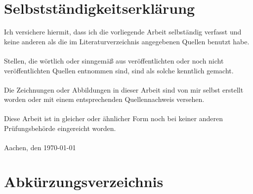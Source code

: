 \documentclass[a4paper,12pt]{scrreprt}
\begin{document}
\chapter*{Selbstständigkeitserklärung}
\thispagestyle{empty}	%
Ich versichere hiermit, dass ich die vorliegende Arbeit selbständig verfasst und keine anderen als die im Literaturverzeichnis angegebenen Quellen benutzt habe.\\ \\
Stellen, die wörtlich oder sinngemäß aus veröffentlichten oder noch nicht veröffentlichten Quellen entnommen sind, sind als solche kenntlich gemacht.\\ \\ Die Zeichnungen oder Abbildungen in dieser Arbeit sind von mir selbst erstellt worden oder mit einem entsprechenden Quellennachweis versehen.\\ \\ Diese Arbeit ist in gleicher oder ähnlicher Form noch bei keiner anderen Prüfungsbehörde eingereicht worden.\\ \\[2ex]
Aachen, den \today \hspace{4cm} \dotfill 
\tableofcontents

\clearpage
\chapter*{Abkürzungsverzeichnis}\label{abkuerzungsverzeichnis}
\begin{acronym}[\hspace{3cm}]
\end{acronym}

\cleardoublepage
\end{document}
